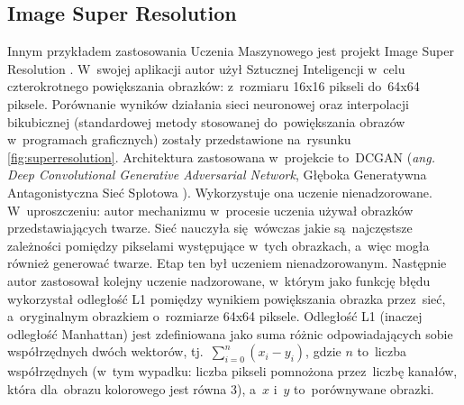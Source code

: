 \documentclass[oneside, 11pt, a4paper]{article}
\begin{document}
\begin{multicols}{2}
\subsection{Image Super Resolution}
Innym przykładem zastosowania Uczenia Maszynowego jest projekt Image Super Resolution \cite{SuperResolution}. W~swojej aplikacji autor użył Sztucznej Inteligencji w~celu czterokrotnego powiększania obrazków: z~rozmiaru 16x16 pikseli do~64x64 piksele. Porównanie wyników działania sieci neuronowej oraz interpolacji bikubicznej (standardowej metody stosowanej do~powiększania obrazów w~programach graficznych) zostały przedstawione na~rysunku \ref{fig:superresolution}.
Architektura zastosowana w~projekcie to~DCGAN (\textit{ang. Deep Convolutional Generative Adversarial Network}, Głęboka Generatywna Antagonistyczna Sieć Splotowa \cite{DBLP:journals/corr/RadfordMC15}). Wykorzystuje ona uczenie nienadzorowane.
W~uproszczeniu: autor mechanizmu w~procesie uczenia używał obrazków przedstawiających twarze. Sieć nauczyła się~wówczas jakie są~najczęstsze zależności pomiędzy pikselami występujące w~tych obrazkach, a~więc mogła również generować twarze.
Etap ten był uczeniem nienadzorowanym. Następnie autor zastosował kolejny uczenie nadzorowane, w~którym jako funkcję błędu wykorzystał odległość L1 pomiędzy wynikiem powiększania obrazka przez~sieć, a~oryginalnym obrazkiem o~rozmiarze 64x64 piksele. Odległość L1 (inaczej odległość Manhattan) jest zdefiniowana jako suma różnic odpowiadających sobie współrzędnych dwóch wektorów, tj.~$\sum\limits_{i=0}^n (x_i - y_i)$, gdzie $n$ to~liczba współrzędnych (w~tym wypadku: liczba pikseli pomnożona przez~liczbę kanałów, która dla~obrazu kolorowego jest równa 3), a~$x$ i~$y$ to~porównywane obrazki.


\end{multicols}
\end{document}
